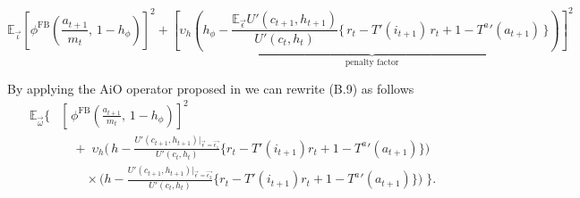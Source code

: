 \documentclass[11pt]{article}
\begin{document}
\begin{equation}
  \mathbb{E}_{\vec{\iota}}\left[\phi^{\text{FB}}\!\left(
  \frac{a_{t+1}}{m_t},\,
  1 - h_{\phi}
  \right) \right]^2 + 
  \underbrace{\left[ \upsilon_h\!\left(h_{\phi} - \frac{\mathbb{E}_{\vec{\epsilon}} U'(c_{t+1},h_{t+1})}{U'(c_t,h_t)}\Big\{\, r_t - T'(i_{t+1})\,r_t + 1 - {T^a}'(a_{t+1}) \,\Big\}\right) \right]^2}_{\text{penalty factor}}
\end{equation}

By applying the AiO operator proposed in \cite{maliar2021deep} we can rewrite (B.9) as follows
\label{objfunc:AiO}
\begin{equation}
\begin{aligned}
\mathbb{E}_{\vec{\omega}} \Big\{ &
    \left[\,
      \phi^{\text{FB}}\!\left(
        \tfrac{a_{t+1}}{m_t},\,
        1 - h_{\phi}
      \right)
    \right]^2
    \\
    &\quad +\;
    \upsilon_h \Bigg(
      \,h - 
      \frac{U'(c_{t+1},h_{t+1})|_{\vec{\epsilon}=\vec{\epsilon_1}}}
           {U'(c_t,h_t)}
      \Big\{ r_t - T'(i_{t+1}) r_t + 1 - {T^a}'(a_{t+1}) \Big\}
    \Bigg)
    \\
    &\qquad \times
    \Bigg(
      h - 
      \frac{U'(c_{t+1},h_{t+1})|_{\vec{\epsilon}=\vec{\epsilon_2}}}
           {U'(c_t,h_t)}
      \Big\{ r_t - T'(i_{t+1}) r_t + 1 - {T^a}'(a_{t+1}) \Big\}
    \Bigg)
\;\Big\}.
\end{aligned}
\end{equation}


\printbibliography[title={REFERENCES }, heading=bibintoc]
\end{document}
